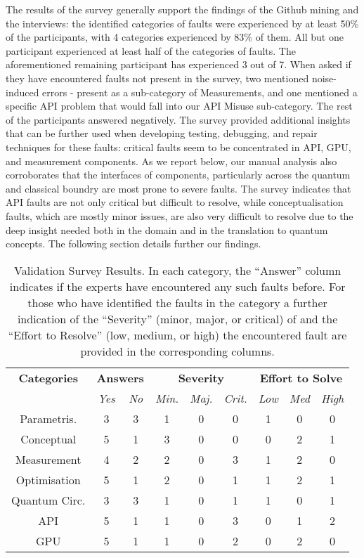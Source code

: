 The results of the survey generally support the findings of the Github mining and the interviews: the identified categories of faults were experienced by at least 50\% of the participants, with 4 categories experienced by 83\% of them. All but one participant experienced at least half of the categories of faults. The aforementioned remaining participant has experienced 3 out of 7. When asked if they have encountered faults not present in the survey, two mentioned noise-induced errors - present as a sub-category of Measurements, and one mentioned a specific API problem that would fall into our API Misuse sub-category. The rest of the participants answered negatively. 
The survey provided additional insights that can be further used when developing testing, debugging, and repair techniques for these faults: critical faults seem to be concentrated in API, GPU, and measurement components. As we report below, our manual analysis also corroborates that the interfaces of components, particularly across the quantum and classical boundry are most prone to severe faults. The survey indicates that API faults are not only critical but difficult to resolve, while conceptualisation faults, which are mostly minor issues, are also very difficult to resolve due to the deep insight needed both in the domain and in the translation to quantum concepts. The following section details further our findings.

\begin{table}[hbt!]
    \centering
        \caption{Validation Survey Results. In each category, the ``Answer'' column indicates if the experts have encountered any such faults before. For those who have identified the faults in the category a further indication of the ``Severity'' (minor, major, or critical) of and the ``Effort to Resolve'' (low, medium, or high) the encountered fault are provided in the corresponding columns. }
    \label{tab:survey}
    \begin{tabular}{@{}c|@{}cc@{}|@{}ccc@{}|@{}ccc}
    \textbf{Categories}     & \multicolumn{2}{c|}{\textbf{Answers}}  & \multicolumn{3}{c|}{\textbf{Severity}} & \multicolumn{3}{c}{\textbf{Effort to Solve}} \\
                    & \textit{Yes} & \textit{No} & \textit{Min.} & \textit{Maj.} & \textit{Crit.} & \textit{Low} &  \textit{Med} & \textit{High} \\
    \hline
    Parametris.    & 3  & 3 & 1 & 0 & 0 & 1 &0 &  0\\
    \hline
    Conceptual     & 5 &  1 & 3 & 0 & 0 & 0 &2&  1\\
    \hline
    Measurement     & 4 & 2 &  2 & 0 & 3 & 1 & 2 & 0 \\
    \hline
    Optimisation     & 5 & 1 & 2 & 0 & 1 & 1 & 2 & 1\\
    \hline
    Quantum Circ.     & 3 & 3 & 1 & 0 & 1 & 1 & 0 & 1\\
    \hline
    API     & 5 & 1 & 1 &  0 & 3 & 0 & 1 & 2 \\
    \hline
    GPU     & 5 & 1 & 1 & 0 & 2 & 0 & 2 &  0 \\
    \end{tabular}
\end{table}

